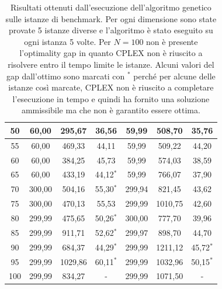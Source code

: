 \begin{table}[htbp]
{\begin{tabular}{c|c|c|c|c|c|c|}
			\multicolumn{1}{|c|}{50} & 60,00 & 295,67 & 36,56 & 59,99 & 508,70 & 35,76 \\ \hline
			\multicolumn{1}{|c|}{55} & 60,00 & 469,33 & 44,11 & 59,99 & 509,22 & 44,20 \\ \hline
			\multicolumn{1}{|c|}{60} & 60,00 & 384,25 & 45,73 & 59,99 & 574,03 & 38,59 \\ \hline
			\multicolumn{1}{|c|}{65} & 60,00 & 433,19 & 44,12$^*$ & 59,99 & 766,07 & 37,90 \\ \hline
			\multicolumn{1}{|c|}{70} & 300,00 & 504,16 & 55,30$^*$ & 299,94 & 821,45 & 43,62 \\ \hline
			\multicolumn{1}{|c|}{75} & 300,00 & 470,13 & 55,53 & 299,99 & 1010,75 & 42,60 \\ \hline
			\multicolumn{1}{|c|}{80} & 299,99 & 475,65 & 50,26$^*$ & 300,00 & 777,70 & 39,96 \\ \hline
			\multicolumn{1}{|c|}{85} & 299,99 & 911,71 & 52,62$^*$ & 299,97 & 898,70 & 44,70 \\ \hline
			\multicolumn{1}{|c|}{90} & 299,99 & 684,37 & 44,29$^*$ & 299,99 & 1211,12 & 45,72$^*$ \\ \hline
			\multicolumn{1}{|c|}{95} & 299,99 & 1029,86 & 60,11$^*$ & 299,99 & 1032,96 & 50,15$^*$ \\ \hline
			\multicolumn{1}{|c|}{100} & 299,99 & 834,27 & - & 299,99 & 1071,50 & - \\ \hline
		\end{tabular}%
	}
	\caption{Risultati ottenuti dall'esecuzione dell'algoritmo genetico sulle istanze di benchmark. Per ogni dimensione sono state provate 5 istanze diverse e l'algoritmo è stato eseguito su ogni istanza 5 volte. Per $N=100$ non è presente l'optimality gap in quanto CPLEX non è riuscito a risolvere entro il tempo limite le istanze. Alcuni valori del gap dall'ottimo sono marcati con $^*$ perché per alcune delle istanze così marcate, CPLEX non è riuscito a completare l'esecuzione in tempo e quindi ha fornito una soluzione ammissibile ma che non è garantito essere ottima.}
	\label{tab:ga-recap}
\end{table}

